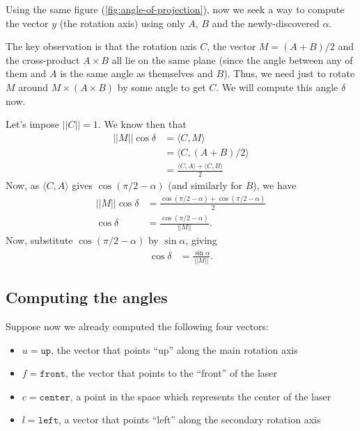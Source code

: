\documentclass{article}
\begin{document}
Using the same figure (\ref{fig:angle-of-projection}),
now we seek a way to compute the vector $y$
(the rotation axis)
using only $A$, $B$ and the newly-discovered $\alpha$.

The key observation is that the rotation axis $C$,
the vector $M = (A + B)/2$ and the cross-product $A \times B$
all lie on the same plane
(since the angle between any of them and $A$ is the same angle as
themselves and $B$).
Thus, we need just to rotate $M$ around $M \times (A \times B)$
by some angle to get $C$.
We will compute this angle $\delta$ now.

Let's impose $||C|| = 1$.
We know then that
\begin{align*}
    ||M|| \cos \delta &= \langle C, M \rangle \\
                      &= \langle C, (A + B) / 2 \rangle \\
                      &= \frac{ \langle C, A \rangle + \langle C, B \rangle }{2}
\end{align*}
Now, as $\langle C, A \rangle$ gives $\cos( \pi/2 - \alpha )$
(and similarly for $B$),
we have
\begin{align*}
    ||M|| \cos \delta &= \frac{ \cos(\pi/2 - \alpha) + \cos(\pi/2 - \alpha)}{2} \\
    \cos \delta &= \frac{\cos(\pi/2 - \alpha)}{||M||}.
\end{align*}
Now, substitute $\cos(\pi/2 - \alpha)$ by $\sin \alpha$, giving
\begin{align*}
    \cos \delta &= \frac{\sin \alpha}{||M||}.
\end{align*}

\subsection{Computing the angles}

Suppose now we already computed the following four vectors:
\begin{itemize}
    \item $u = \texttt{up}$,
        the vector that points ``up'' along the main rotation axis
    \item $f = \texttt{front}$,
        the vector that points to the ``front'' of the laser
    \item $c = \texttt{center}$,
        a point in the space which represents the center of the laser
    \item $l = \texttt{left}$,
        a vector that points ``left'' along the secondary rotation axis
\end{itemize}
\end{document}
